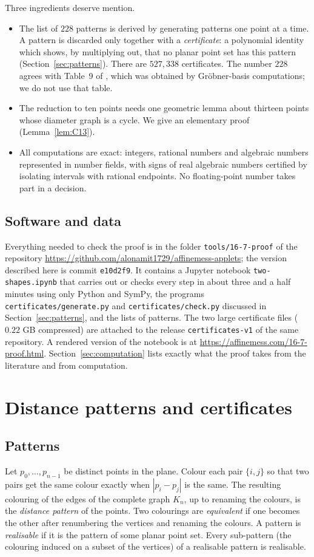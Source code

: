 \documentclass[11pt]{amsart}
\theoremstyle{definition}
\theoremstyle{remark}
\newcommand{\repo}{\url{https://github.com/alonamit1729/affinemess-applets}}
\begin{document}
Three ingredients deserve mention.
\begin{itemize}
\item The list of $228$ patterns is derived by generating patterns one point at a time. A pattern is
  discarded only together with a \emph{certificate}: a polynomial identity which shows, by multiplying
  out, that no planar point set has this pattern (Section~\ref{sec:patterns}). There are $527{,}338$
  certificates. The number $228$ agrees with Table~9 of \cite{SO}, which was obtained by Gröbner-basis
  computations; we do not use that table.
\item The reduction to ten points needs one geometric lemma about thirteen points whose diameter graph is
  a cycle. We give an elementary proof (Lemma~\ref{lem:C13}).
\item All computations are exact: integers, rational numbers and algebraic numbers represented in
  number fields, with signs of real algebraic numbers certified by isolating intervals with rational
  endpoints. No floating-point number takes part in a decision.
\end{itemize}

\subsection*{Software and data}
Everything needed to check the proof is in the folder \texttt{tools/16-7-proof} of the repository
\repo{}; the version described here is commit \texttt{e10d2f9}. It contains a Jupyter notebook
\texttt{two-shapes.ipynb} that carries out or checks every step in about three and a half minutes using
only Python and SymPy, the programs \texttt{certificates/generate.py} and \texttt{certificates/check.py}
discussed in Section~\ref{sec:patterns}, and the lists of patterns. The two large certificate files
($0.22$ GB compressed) are attached to the release \texttt{certificates-v1} of the same repository. A
rendered version of the notebook is at \url{https://affinemess.com/16-7-proof.html}.
Section~\ref{sec:computation} lists exactly what the proof takes from the literature and from computation.

\section{Distance patterns and certificates}\label{sec:defs}

\subsection{Patterns}
Let $p_0,\dots,p_{n-1}$ be distinct points in the plane. Colour each pair $\{i,j\}$ so that two pairs get
the same colour exactly when $|p_i-p_j|$ is the same. The resulting colouring of the edges of the complete
graph $K_n$, up to renaming the colours, is the \emph{distance pattern} of the points. Two colourings are
\emph{equivalent} if one becomes the other after renumbering the vertices and renaming the colours. A
pattern is \emph{realisable} if it is the pattern of some planar point set. Every sub-pattern (the
colouring induced on a subset of the vertices) of a realisable pattern is realisable.
\end{document}
